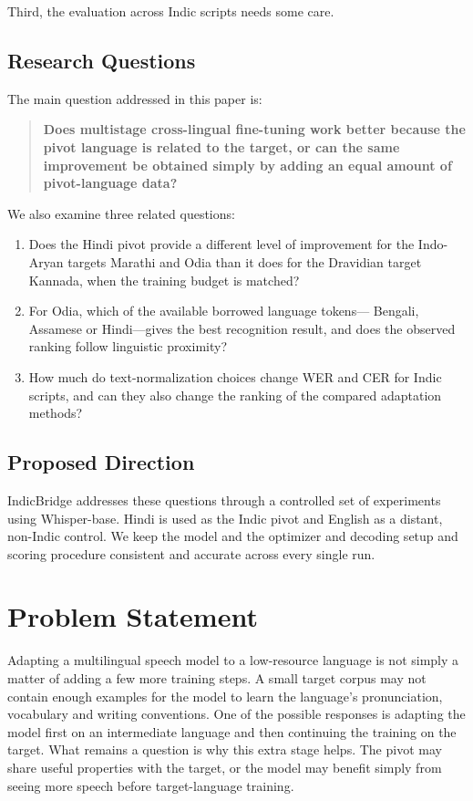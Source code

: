 \documentclass[conference]{IEEEtran}
\begin{document}
Third, the evaluation across Indic scripts needs some care.

\subsection{Research Questions}

The main question addressed in this paper is:

\begin{quote}
\textbf{Does multistage cross-lingual fine-tuning work better because
the pivot language is related to the target, or can the same improvement
be obtained simply by adding an equal amount of pivot-language data?}
\end{quote}

We also examine three related questions:

\begin{enumerate}
    \item Does the Hindi pivot provide a different level of improvement
    for the Indo-Aryan targets Marathi and Odia than it does for the
    Dravidian target Kannada, when the training budget is matched?
    \item For Odia, which of the available borrowed language tokens---
    Bengali, Assamese or Hindi---gives the best recognition result, and
    does the observed ranking follow linguistic proximity?
    \item How much do text-normalization choices change WER and CER for
    Indic scripts, and can they also change the ranking of the compared
    adaptation methods?
\end{enumerate}

\subsection{Proposed Direction}

IndicBridge addresses these questions through a controlled set of experiments using Whisper-base. Hindi is used as the Indic pivot and English as a distant, non-Indic control. We keep the model and the optimizer and decoding setup and scoring procedure consistent and accurate across every single run.

\section{Problem Statement}

Adapting a multilingual speech model to a low-resource language is not simply a matter of adding a few more training steps. A small target corpus may not contain enough examples for the model to learn the language's pronunciation, vocabulary and writing conventions. One of the possible responses is adapting the model first on an intermediate language and then continuing the training on the target. What remains a question is why this extra stage helps. The pivot may share useful properties with the target, or the model may benefit simply from seeing more speech before target-language training.
\end{document}
